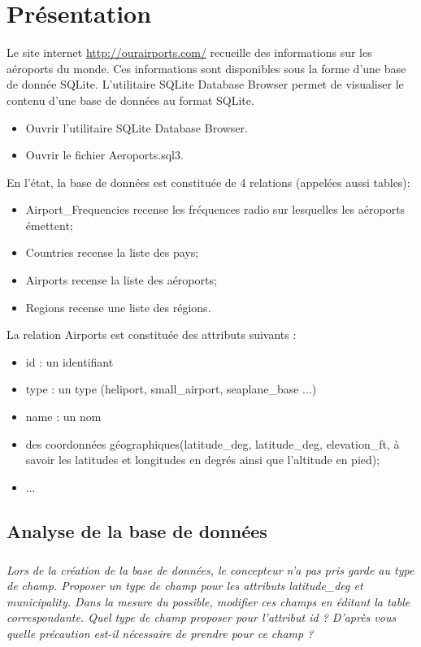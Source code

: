 \documentclass[10pt]{article}
\begin{document}




\section*{Présentation}
Le site internet \url{http://ourairports.com/} recueille des informations sur les aéroports du monde. Ces informations sont disponibles sous la forme d'une base de donnée SQLite. 
L'utilitaire SQLite Database Browser permet de visualiser le contenu d'une base de données au format SQLite. 

\begin{itemize}%
\item Ouvrir l'utilitaire SQLite Database Browser.
\item Ouvrir le fichier \textsf{Aeroports.sql3}.
\end{itemize}

En l'état, la base de données est constituée de 4 relations (appelées aussi tables): 
\begin{itemize}
\item \textsf{Airport\_Frequencies} recense les fréquences radio sur lesquelles les aéroports émettent;
\item \textsf{Countries} recense la liste des pays;
\item \textsf{Airports} recense la liste des aéroports;
\item \textsf{Regions} recense une liste des régions.
\end{itemize}

La relation \textsf{Airports} est constituée des attributs suivants : 
\begin{itemize}
\item \textsf{id} : un identifiant
\item \textsf{type} : un type (heliport, small\_airport, seaplane\_base ...)
\item \textsf{name} : un nom
\item des coordonnées géographiques(\textsf{latitude\_deg}, \textsf{latitude\_deg}, \textsf{elevation\_ft}, à savoir les latitudes et longitudes en degrés ainsi que l'altitude en pied);
\item ...
\end{itemize}

\subsection*{Analyse de la base de données}
\subparagraph{}
\textit{Lors de la création de la base de données, le concepteur n'a pas pris garde au type de champ. Proposer un type de champ pour les attributs \textsf{latitude\_deg} et \textsf{municipality}. Dans la mesure du possible, modifier ces champs en éditant la table correspondante. Quel type de champ proposer pour l'attribut \textsf{id} ? D'après vous quelle précaution est-il nécessaire de prendre pour ce champ ?}
\end{document}
